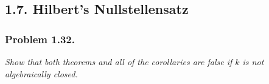 \documentclass{article}
\begin{document}



\subsection*{1.7. Hilbert's Nullstellensatz \\}



\subsubsection*{Problem 1.32.}
\emph{Show that both theorems and all of the corollaries are false
if $k$ is not algebraically closed.} \\
\end{document}
